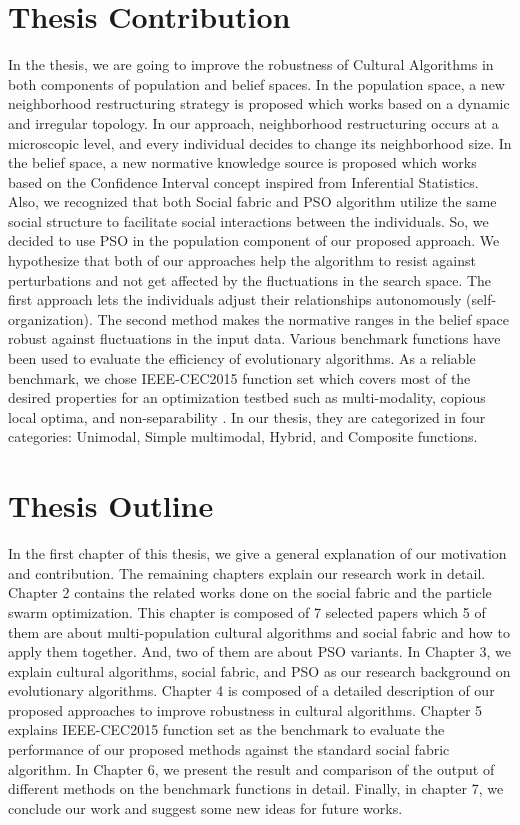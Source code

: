 \section{Thesis Contribution}
In the thesis, we are going to improve the robustness of Cultural Algorithms in both components of population and belief spaces. In the population space, a new neighborhood restructuring strategy is proposed which works based on a dynamic and irregular topology. In our approach, neighborhood restructuring occurs at a microscopic level, and every individual decides to change its neighborhood size. In the belief space, a new normative knowledge source is proposed which works based on the Confidence Interval concept inspired from Inferential Statistics. Also, we recognized that both Social fabric and PSO algorithm utilize the same social structure to facilitate social interactions between the individuals. So, we decided to use PSO in the population component of our proposed approach. We hypothesize that both of our approaches help the algorithm to resist against perturbations and not get affected by the fluctuations in the search space. The first approach lets the individuals adjust their relationships autonomously (self-organization). The second method makes the normative ranges in the belief space robust against fluctuations in the input data. \newline Various benchmark functions have been used to evaluate the efficiency of evolutionary algorithms. As a reliable benchmark, we chose IEEE-CEC2015 function set which covers most of the desired properties for an optimization testbed such as multi-modality, copious local optima, and non-separability \cite{chen2014problem}. In our thesis, they are categorized in four categories: Unimodal, Simple multimodal, Hybrid, and Composite functions.
\section{Thesis Outline}
In the first chapter of this thesis, we give a general explanation of our motivation and contribution. The remaining chapters explain our research work in detail. Chapter 2 contains the related works done on the social fabric and the particle swarm optimization. This chapter is composed of 7 selected papers which 5 of them are about multi-population cultural algorithms and social fabric and how to apply them together. And, two of them are about PSO variants. In Chapter 3, we explain cultural algorithms, social fabric, and PSO as our research background on evolutionary algorithms. Chapter 4 is composed of a detailed description of our proposed approaches to improve robustness in cultural algorithms. Chapter 5 explains IEEE-CEC2015 function set as the benchmark to evaluate the performance of our proposed methods against the standard social fabric algorithm. In Chapter 6, we present the result and comparison of the output of different methods on the benchmark functions in detail. Finally, in chapter 7, we conclude our work and suggest some new ideas for future works.